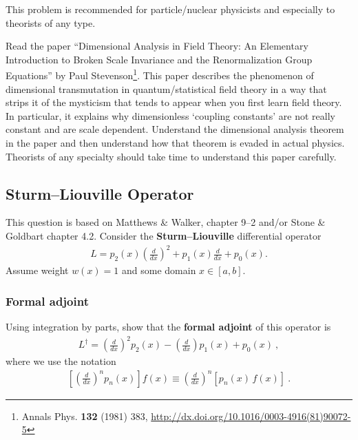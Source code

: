 \documentclass[12pt]{article}
\numberwithin{equation}{subsection}    %
\begin{document}
This problem is recommended for particle/nuclear physicists and especially to theorists of any type.

Read the paper ``Dimensional Analysis in Field Theory: An Elementary Introduction to Broken Scale Invariance and the Renormalization Group Equations'' by Paul Stevenson\footnote{Annals Phys. \textbf{132} (1981) 383, \url{http://dx.doi.org/10.1016/0003-4916(81)90072-5}}. This paper describes the phenomenon of dimensional transmutation in quantum/statistical field theory in a way that strips it of the mysticism that tends to appear when you first learn field theory. In particular, it explains why dimensionless `coupling constants' are not really constant and are scale dependent. Understand the  dimensional analysis theorem in the paper and then understand how that theorem is evaded in actual physics. Theorists of any specialty should take time to understand this paper carefully.\


\subsection{Sturm--Liouville Operator}

This question is based on Matthews \& Walker, chapter 9--2 and/or Stone \& Goldbart chapter 4.2. Consider the \textbf{Sturm--Liouville} differential operator
\begin{align}
	L = p_2(x) \left(\frac{d}{dx}\right)^2
	+ p_1(x)\frac{d}{dx}
	+ p_0(x) .
\end{align}
Assume weight $w(x) = 1$ and some domain $x\in [a,b]$.


\subsubsection{Formal adjoint}
Using integration by parts, show that the \textbf{formal adjoint} of this operator is 
\begin{align}
	L^\dag = \left(\frac{d}{dx}\right)^2 p_2(x)
	- \left(\frac{d}{dx}\right)p_1(x)
	+ p_0(x) \ ,
\end{align}
where we use the notation 
\begin{align}
	\left[\left(\frac{d}{dx}\right)^n p_n(x)\right] f(x) \equiv 
		\left(\frac{d}{dx}\right)^n 
		\left[ p_n(x)\, f(x)\right] \ .
\end{align}
\end{document}

